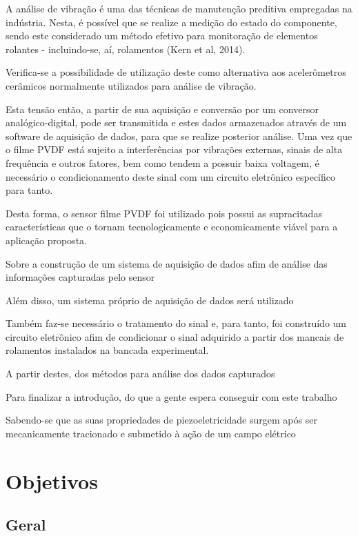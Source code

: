 \documentclass[
	12pt,				
	oneside,			
	a4paper,			
	english,			
	brazil				
	]{abntex2ppgsi}
\begin{document}
A análise de vibração é uma das técnicas de manutenção preditiva empregadas na indústria. Nesta, é possível que se realize a medição do estado do componente, sendo este considerado um método efetivo para monitoração de elementos rolantes - incluindo-se, aí, rolamentos (Kern et al, 2014). 

Verifica-se a possibilidade de utilização deste como alternativa aos acelerômetros cerâmicos normalmente utilizados para análise de vibração.    

Esta tensão então, a partir de sua aquisição e conversão por um conversor analógico-digital, pode ser transmitida e estes dados armazenados através de um software de aquisição de dados, para que se realize posterior análise. Uma vez que o filme PVDF está sujeito a interferências por vibrações externas, sinais de alta frequência e outros fatores, bem como tendem a possuir baixa voltagem, é necessário o condicionamento deste sinal com um circuito eletrônico específico para tanto. 

Desta forma, o sensor filme PVDF foi utilizado pois possui as supracitadas características que o tornam tecnologicamente e economicamente viável para a aplicação proposta. 

Sobre a construção de um sistema de aquisição de dados afim de análise das informações capturadas pelo sensor

Além disso, um sistema próprio de aquisição de dados será utilizado 

Também faz-se necessário o tratamento do sinal e, para tanto, foi construído um circuito eletrônico afim de condicionar o sinal adquirido a partir dos mancais de rolamentos instalados na bancada experimental. 

A partir destes, dos métodos para análise dos dados capturados

Para finalizar a introdução, do que a gente espera conseguir com este trabalho

Sabendo-se que as suas propriedades de piezoeletricidade surgem após ser mecanicamente tracionado e submetido à ação de um campo elétrico 


\chapter{Objetivos}

\section{\textbf {Geral}}
\end{document}
